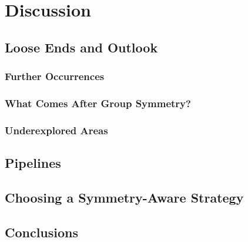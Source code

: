 \documentclass[mathematics,review,submit,moreauthors]{Definitions/mdpi}
\begin{document}
\section{Discussion}

\subsection{Loose Ends and Outlook}

\subsubsection{Further Occurrences}

\subsubsection{What Comes After Group Symmetry?}

\subsubsection{Underexplored Areas}

\subsection{Pipelines}

\subsection{Choosing a Symmetry-Aware Strategy}


\subsection{Conclusions}

\authorcontributions{}

\funding{}

\acknowledgments{}

\end{document}

